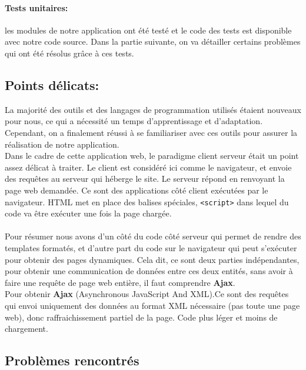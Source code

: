 		\paragraph{Tests unitaires:} les modules de notre application ont été testé et le code des tests est disponible avec notre code source. Dans la partie suivante, on va détailler certains problèmes qui ont été résolus grâce à ces tests.
		\subsection{Points délicats:}
	La majorité des outils et des langages de programmation utilisés étaient nouveaux pour nous, ce qui a nécessité un temps d'apprentissage et d'adaptation. Cependant, on a finalement réussi à se familiariser avec ces outils pour assurer la réalisation de notre application.\\
	
	Dans le cadre de cette application web, le paradigme client serveur était un point assez délicat à traiter. Le client est considéré ici comme le navigateur, et envoie des requêtes au serveur qui héberge le site. Le serveur répond en renvoyant la page web demandée. 
	Ce sont des applications côté client exécutées par le navigateur. HTML met en place des balises spéciales, \lstinline!<script>! dans lequel du code va être exécuter une fois la page chargée.
		\paragraph{}Pour résumer nous avons d'un côté du code côté serveur qui permet de rendre des templates formatés, et d'autre part du code sur le navigateur qui peut s'exécuter pour obtenir des pages dynamiques. Cela dit, ce sont deux parties indépendantes, pour obtenir une communication de données entre ces deux entités, sans avoir à faire une requête de page web entière, il faut comprendre \textbf{Ajax}.\\
		Pour obtenir \textbf{Ajax} (Asynchronous JavaScript And XML).Ce sont des requêtes qui envoi uniquement des données au format XML nécessaire (pas toute une page web), donc raffraichissement partiel de la page. Code plus léger et moins de chargement.
		

		\subsection{Problèmes rencontrés}

